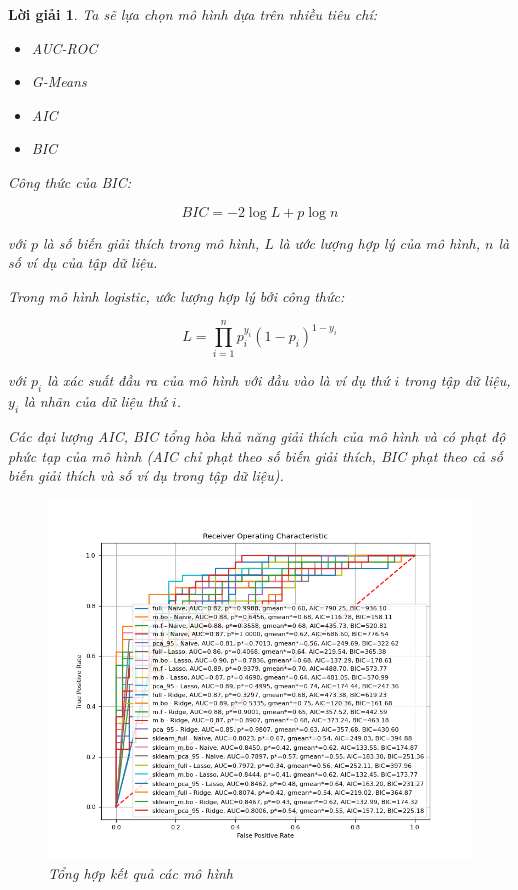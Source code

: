 \documentclass[14pt, a4paper]{article}
\theoremstyle{sltheorem}
\theoremstyle{soltheorem}
\newtheorem*{loigiai}{Lời giải}
\begin{document}
\begin{loigiai}
    Ta sẽ lựa chọn mô hình dựa trên nhiều tiêu chí:

    \begin{itemize}
        \item AUC-ROC
        \item G-Means
        \item AIC
        \item BIC
    \end{itemize}

    Công thức của BIC:

    \begin{equation*}
        BIC = -2 \log L + p\log n
    \end{equation*}

    với $p$ là số biến giải thích trong mô hình, $L$ là ước lượng hợp lý của mô hình, $n$ là số ví dụ của tập dữ liệu.

    Trong mô hình logistic, ước lượng hợp lý bởi công thức:

    \begin{equation*}
        L = \prod_{i=1}^n p_i^{y_i}(1-p_i)^{1 - y_i}
    \end{equation*}

    với $p_i$ là xác suất đầu ra của mô hình với đầu vào là ví dụ thứ $i$ trong tập dữ liệu, $y_i$ là nhãn của dữ liệu thứ $i$.

    Các đại lượng AIC, BIC tổng hòa khả năng giải thích của mô hình và có phạt độ phức tạp của mô hình (AIC chỉ phạt theo số biến giải thích, BIC phạt theo cả số biến giải thích và số ví dụ trong tập dữ liệu).

    \begin{figure}[h!]
        \centering
        \includegraphics[width=1.0\textwidth]{figures/roc_curve_summary.png}
        \caption{Tổng hợp kết quả các mô hình}
        \label{fig:roc-curve-summary}
    \end{figure}


\end{loigiai}
\end{document}
